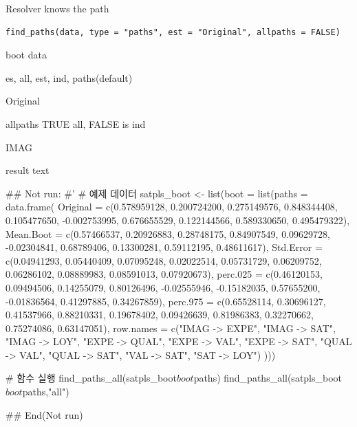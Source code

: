 \documentclass[a4paper]{book}
\begin{document}
%
\begin{Description}
Resolver knows the path
\end{Description}
%
\begin{Usage}
\begin{verbatim}
find_paths(data, type = "paths", est = "Original", allpaths = FALSE)
\end{verbatim}
\end{Usage}
%
\begin{Arguments}
\begin{ldescription}
\item[\code{data}] boot data

\item[\code{type}] es, all, est, ind, paths(default)

\item[\code{est}] Original

\item[\code{allpaths}] allpaths TRUE all, FALSE is ind

\item[\code{start}] IMAG
\end{ldescription}
\end{Arguments}
%
\begin{Value}
result text
\end{Value}
%
\begin{Examples}
\begin{ExampleCode}

\#\# Not run: 
#'
# 예제 데이터
satpls_boot <- list(boot = list(paths = data.frame(
  Original = c(0.578959128, 0.200724200, 0.275149576,
  0.848344408, 0.105477650, -0.002753995,
  0.676655529, 0.122144566, 0.589330650, 0.495479322),
  Mean.Boot = c(0.57466537, 0.20926883,
  0.28748175, 0.84907549, 0.09629728,
  -0.02304841, 0.68789406, 0.13300281,
  0.59112195, 0.48611617),
  Std.Error = c(0.04941293, 0.05440409,
   0.07095248, 0.02022514, 0.05731729,
   0.06209752, 0.06286102, 0.08889983,
   0.08591013, 0.07920673),
  perc.025 = c(0.46120153, 0.09494506,
  0.14255079, 0.80126496, -0.02555946,
  -0.15182035, 0.57655200, -0.01836564,
   0.41297885, 0.34267859),
  perc.975 = c(0.65528114, 0.30696127,
   0.41537966, 0.88210331, 0.19678402,
   0.09426639, 0.81986383, 0.32270662,
    0.75274086, 0.63147051),
  row.names = c("IMAG -> EXPE",
  "IMAG -> SAT",
   "IMAG -> LOY", "EXPE -> QUAL",
   "EXPE -> VAL", "EXPE -> SAT",
   "QUAL -> VAL", "QUAL -> SAT",
   "VAL -> SAT", "SAT -> LOY")
)))

# 함수 실행
find_paths_all(satpls_boot$boot$paths)
find_paths_all(satpls_boot$boot$paths,"all")

## End(Not run)

\end{ExampleCode}
\end{Examples}
\end{document}
